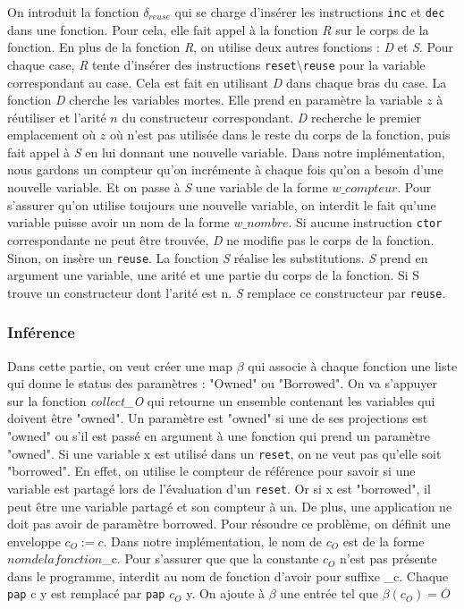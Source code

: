 \documentclass{rapportECL}
\begin{document}
On introduit la fonction $\delta_{reuse}$ qui se charge d'insérer les instructions \verb|inc| et \verb|dec| dans une fonction. Pour cela, elle fait appel à la fonction \textit{R} sur le corps de la fonction.
En plus de la fonction \textit{R}, on utilise deux autres fonctions : \textit{D} et \textit{S}.
Pour chaque case, \textit{R} tente d'insérer des instructions \verb|reset|\textbackslash \verb|reuse| pour la variable correspondant au case. Cela est fait en utilisant \textit{D} dans chaque bras du case.
La fonction \textit{D} cherche les variables mortes. Elle prend en paramètre la variable $z$ à réutiliser et l'arité $n$ du constructeur correspondant. 
\textit{D} recherche le premier emplacement où $z$ où n'est pas utilisée dans le reste du corps de la fonction, puis fait appel à \textit{S} en lui donnant une nouvelle variable. 
Dans notre implémentation, nous gardons un compteur qu'on incrémente à chaque fois qu'on a besoin d'une nouvelle variable. Et on passe à \textit{S} une variable de la forme $w\_compteur$. Pour s'assurer qu'on utilise toujours une nouvelle variable, on interdit le fait qu'une variable puisse avoir un nom de la forme $w\_nombre$. Si aucune instruction \verb|ctor| correspondante ne peut être trouvée, \textit{D} ne modifie pas le corps de la fonction. Sinon, on insère un \verb|reuse|.
La fonction \textit{S} réalise les substitutions. \textit{S} prend en argument une variable, une arité et une partie du corps de la fonction. Si S trouve un constructeur dont l'arité est n. \textit{S} remplace ce constructeur par \verb|reuse|.


\subsubsection{Inférence}
Dans cette partie, on veut créer une map $\beta$ qui associe à chaque fonction une liste qui donne le status des paramètres : "Owned" ou "Borrowed".
On va s'appuyer sur la fonction \textit{collect\_O} qui retourne un ensemble contenant les variables qui doivent être "owned".
Un paramètre est "owned" si une de ses projections est "owned" ou s'il est passé en argument à une fonction qui prend un paramètre "owned".
Si une variable x est utilisé dans un \verb|reset|, on ne veut pas qu'elle soit "borrowed". 
En effet, on utilise le compteur de référence pour savoir si une variable est partagé lors de l'évaluation d'un \verb|reset|. 
Or si x est "borrowed", il peut être une variable partagé et son compteur à un.
De plus, une application ne doit pas avoir de paramètre borrowed. Pour résoudre ce problème, on définit une enveloppe $c_O := c$. 
Dans notre implémentation, le nom de $c_O$ est de la forme $nom de la fonction$\_c. 
Pour s'assurer que que la constante $c_O$ n'est pas présente dans le programme, interdit au nom de fonction d'avoir pour suffixe \_c.
Chaque \verb|pap| c y est remplacé par \verb|pap| $c_O$ y. On ajoute à $\beta$ une entrée tel que $\beta(c_O) = \overline{O}$
\end{document}
